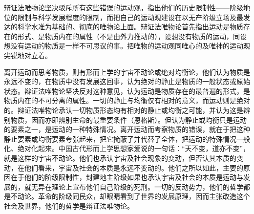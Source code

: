 辩证法唯物论坚决驳斥所有这些错误的运动观，指出他们的历史限制性——阶级地位的限制与科学发展程度的限制，而把自己的运动观建设在以无产阶级立场及最发达的科学水准为基础的、彻底的唯物论上面。辩证法唯物论首先指出运动是物质存在的形式、是物质内在的属性（不是由外力推动的），设想没有物质的运动，同设想没有运动的物质是一样不可思议的事。把唯物的运动观同唯心的及唯神的运动观尖锐地对立着。

离开运动而思考物质，则有形而上学的宇宙不动论或绝对均衡论，他们认为物质是永远不变的，在物质中没有发展这回事，认为绝对的静止是物质的一般状态或原始状态。辩证法唯物论坚决反对这种意见，认为运动是物质存在的最普遍的形式，是物质内在的不可分离的属性。一切的静止与均衡仅有相对的意义，而运动则是绝对的。辩证法唯物论承认一切物质形态均有相对的静止或均衡之可能，并认为这是辨别物质，因而亦即辨别生命的最重要条件（恩格斯）。但认为静止或均衡只是运动的要素之一，是运动的一种特殊情况。离开运动而考察物质的错误，就在于把这种静止要素或均衡要素夸张起来，把它掩蔽了并代替了全体，把运动的特殊情况一般化、绝对化起来。中国古代形而上学思想家爱说的一句话：“天不变，道亦不变”，就是这样的宇宙不动论。他们也承认宇宙及社会现象的变动，但否认其本质的变动，在他们看来，宇宙及社会的本质是永远不变动的。他们之所以如此，主要的原因在于他们的阶级限制性，封建地主阶级如果也承认宇宙及社会的本质是运动与发展的，就无异在理论上宣布他们自己阶级的死刑。一切的反动势力，他们的哲学都是不动论。革命的阶级同民众，却眼睛看到了世界的发展原理，因而主张改造这个社会及世界，他们的哲学是辩证法唯物论。

